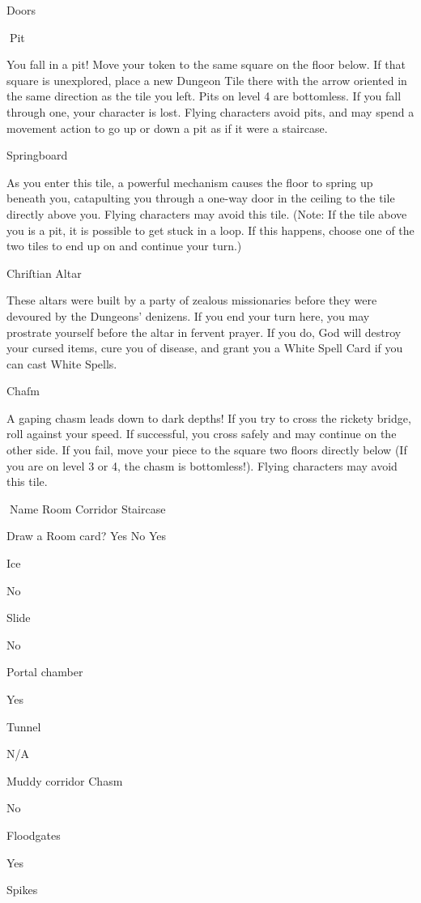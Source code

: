 \documentclass{book}
\begin{document}
\begin{itemize}
Doors

Pit

You fall in a pit! Move your token to the same square on the floor
below. If that square is unexplored, place a new Dungeon Tile there
with the arrow oriented in the same direction as the tile you left.
Pits on level 4 are bottomless. If you fall through one, your character
is lost.
Flying characters avoid pits, and may spend a movement action to go
up or down a pit as if it were a staircase.

Springboard

As you enter this tile, a powerful mechanism causes the floor
to spring up beneath you, catapulting you through a one-way
door in the ceiling to the tile directly above you.
Flying characters may avoid this tile.
(Note: If the tile above you is a pit, it is possible to get stuck in a loop. If this
happens, choose one of the two tiles to end up on and continue your turn.)

Chriſtian Altar

These altars were built by a party of zealous missionaries before
they were devoured by the Dungeons’ denizens. If you end
your turn here, you may prostrate yourself before the altar in
fervent prayer. If you do, God will destroy your cursed items,
cure you of disease, and grant you a White Spell Card if you
can cast White Spells.

Chaſm

A gaping chasm leads down to dark depths! If you try to cross
the rickety bridge, roll against your speed. If successful, you
cross safely and may continue on the other side. If you fail,
move your piece to the square two floors directly below (If you
are on level 3 or 4, the chasm is bottomless!).
Flying characters may avoid this tile.

Name
Room
Corridor
Staircase

Draw a
Room
card?
Yes
No
Yes

Ice

No

Slide

No

Portal
chamber

Yes

Tunnel

N/A

Muddy
corridor
Chasm

No

Floodgates

Yes

Spikes


\end{itemize}
\end{document}
